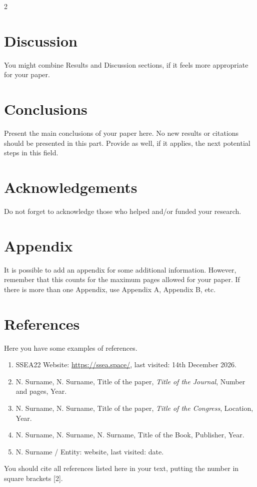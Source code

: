 \documentclass[10pt]{article}
\begin{document}
\begin{multicols}{2}
\section{Discussion}
You might combine Results and Discussion sections, if it feels more appropriate for your paper.

\section{Conclusions}
Present the main conclusions of your paper here. No new results or citations should be presented in this part. Provide as well, if it applies, the next potential steps in this field.

\section*{Acknowledgements}
Do not forget to acknowledge those who helped and/or funded your research.

\section*{Appendix}
It is possible to add an appendix for some additional information. However, remember that this counts for the maximum pages allowed for your paper. If there is more than one Appendix, use Appendix A, Appendix B, etc.

\section*{References}
Here you have some examples of references.

\begin{enumerate}
    \item SSEA22 Website: \url{https://ssea.space/}, last visited: 14th December 2026.
    \item N. Surname, N. Surname, Title of the paper, \textit{Title of the Journal}, Number and pages, Year.
    \item N. Surname, N. Surname, Title of the paper, \textit{Title of the Congress}, Location, Year.
    \item N. Surname, N. Surname, N. Surname, Title of the Book, Publisher, Year.
    \item N. Surname / Entity: website, last visited: date.
\end{enumerate}

You should cite all references listed here in your text, putting the number in square brackets [2].

\end{multicols}
\end{document}
